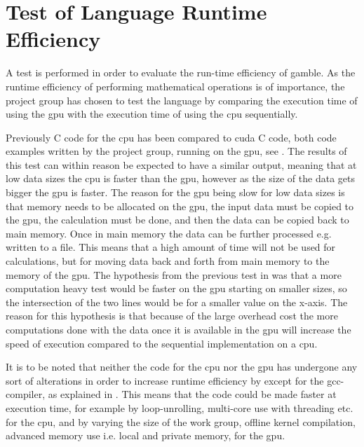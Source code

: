 \section{Test of Language Runtime Efficiency} %
\label{cha:test_of_language}
A test is performed in order to evaluate the run-time efficiency of \gls{gamble}.
As the runtime efficiency of performing mathematical operations is of importance, the project group has chosen to test the language by comparing the execution time of using the \acrshort{gpu} with the execution time of using the \acrshort{cpu} sequentially.

Previously C code for the \acrshort{cpu} has been compared to \gls{cuda} C code, both code examples written by the project group, running on the \acrshort{gpu}, see .
The results of this test can within reason be expected to have a similar output, meaning that at low data sizes the \acrshort{cpu} is faster than the \acrshort{gpu}, however as the size of the data gets bigger the \acrshort{gpu} is faster.
The reason for the \acrshort{gpu} being slow for low data sizes is that memory needs to be allocated on the \acrshort{gpu}, the input data must be copied to the \acrshort{gpu}, the calculation must be done, and then the data can be copied back to main memory.
Once in main memory the data can be further processed e.g. written to a file.
This means that a high amount of time will not be used for calculations, but for moving data back and forth from main memory to the memory of the \acrshort{gpu}.
The hypothesis from the previous test in  was that a more computation heavy test would be faster on the \acrshort{gpu} starting on smaller sizes, so the intersection of the two lines would be for a smaller value on the x-axis.
The reason for this hypothesis is that because of the large overhead cost the more computations done with the data once it is available in the \acrshort{gpu} will increase the speed of execution compared to the sequential implementation on a \acrshort{cpu}.

It is to be noted that neither the code for the \acrshort{cpu} nor the \acrshort{gpu} has undergone any sort of alterations in order to increase runtime efficiency by except for the gcc-compiler, as explained in .
This means that the code could be made faster at execution time, for example by loop-unrolling, multi-core use with threading etc. for the \acrshort{cpu}, and by varying the size of the work group, offline kernel compilation, advanced memory use i.e. local and private memory, for the \acrshort{gpu}.

